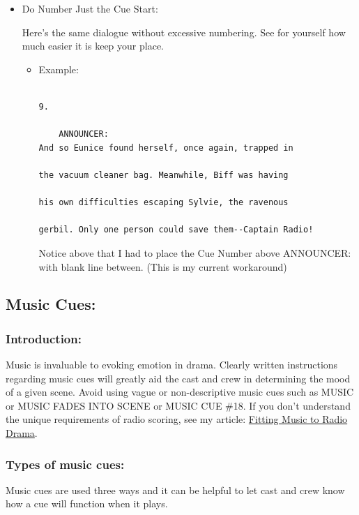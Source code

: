 \documentclass[openleft,oneside,showtrims]{memoir}
\begin{document}
\begin{itemize}
\item Do Number Just the Cue Start:
\label{sec:org535ae48}

Here's the same dialogue without excessive numbering. See for yourself how much easier it is keep your place.
\begin{itemize}
\item Example:
\label{sec:org96ba32a}

\lstset{language=fountain,label= ,caption= ,captionpos=b,numbers=none}
\begin{lstlisting}

9.

    ANNOUNCER:
And so Eunice found herself, once again, trapped in
  
the vacuum cleaner bag. Meanwhile, Biff was having
  
his own difficulties escaping Sylvie, the ravenous
  
gerbil. Only one person could save them--Captain Radio!

\end{lstlisting}

Notice above that I had to place the Cue Number above ANNOUNCER: with blank line between.  (This is my current workaround)
\end{itemize}
\end{itemize}
\subsection{Music Cues:}
\label{sec:orge145789}
\subsubsection*{Introduction:}
\label{sec:org5fd58ba}

Music is invaluable to evoking emotion in drama. Clearly written instructions regarding music cues will greatly aid the cast and crew in determining the mood of a given scene. Avoid using vague or non-descriptive music cues such as MUSIC or MUSIC FADES INTO SCENE or MUSIC CUE \#18. If you don't understand the unique requirements of radio scoring, see my article: \href{https://www.ruyasonic.com/mus\_score\_1.htm}{Fitting Music to Radio Drama}.

\subsubsection*{Types of music cues:}
\label{sec:org097b8c2}

Music cues are used three ways and it can be helpful to let cast and crew know how a cue will function when it plays.
\end{document}
